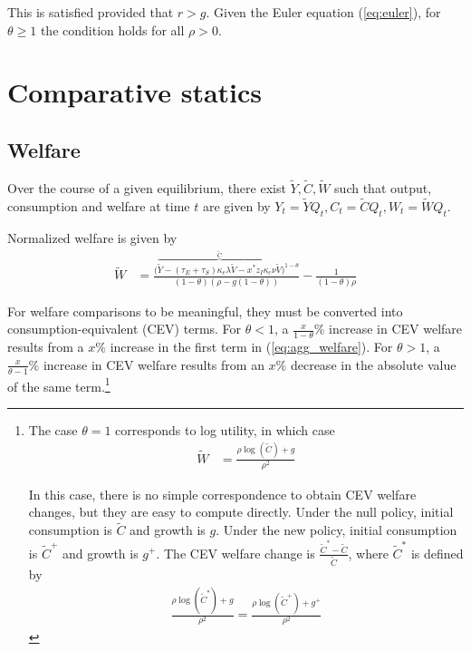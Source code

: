 \documentclass[12pt,english]{article}
\theoremstyle{remark}
\begin{document}
This is satisfied provided that $r > g$. Given the Euler equation (\ref{eq:euler}), for $\theta \ge 1$ the condition holds for all $\rho > 0$. 

\section{Comparative statics}

\subsection{Welfare}

Over the course of a given equilibrium, there exist $\tilde{Y},\tilde{C},\tilde{W}$ such that output, consumption and welfare at time $t$ are given by $Y_t = \tilde{Y} Q_t, C_t = \tilde{C} Q_t, W_t = \tilde{W} Q_t$. 

Normalized welfare is given by 
\begin{align}
\tilde{W} &= \frac{\big(\overbrace{\tilde{Y} - (\tau_E + \tau_S) \kappa_{e} \lambda \tilde{V} - x^* z_I \kappa_c \nu \tilde{V}}^{\tilde{C}}\big)^{1-\theta}}{(1-\theta)(\rho - g(1-\theta))} - \frac{1}{(1-\theta)\rho}  \label{eq:agg_welfare}
\end{align}


For welfare comparisons to be meaningful, they must be converted into consumption-equivalent (CEV) terms. For $\theta < 1$, a $\frac{x}{1-\theta}\%$ increase in CEV welfare results from a $x\%$ increase in the first term in (\ref{eq:agg_welfare}). For $\theta > 1$, a $\frac{x}{\theta-1}\%$ increase in CEV welfare results from an $x\%$ decrease in the absolute value of the same term.\footnote{The case $\theta = 1$ corresponds to log utility, in which case
	\begin{align}
	\tilde{W} &= \frac{\rho \log(\tilde{C}) + g}{\rho^2} \label{eq:agg_welfare_log}
	\end{align}
	
	In this case, there is no simple correspondence to obtain CEV welfare changes, but they are easy to compute directly. Under the null policy, initial consumption is $\tilde{C}$ and growth is $g$. Under the new policy, initial consumption is $\tilde{C}^+$ and growth is $g^+$. The CEV welfare change is $\frac{\tilde{C}^* - \tilde{C}}{\tilde{C}}$, where $\tilde{C}^*$ is defined by 
	\begin{align}
	\frac{\rho\log(\tilde{C}^*) + g}{\rho^2} = \frac{\rho \log(\tilde{C}^+) + g^+}{\rho^2} \label{eq:agg_welfare_log_CEV}
	\end{align}}
\end{document}
